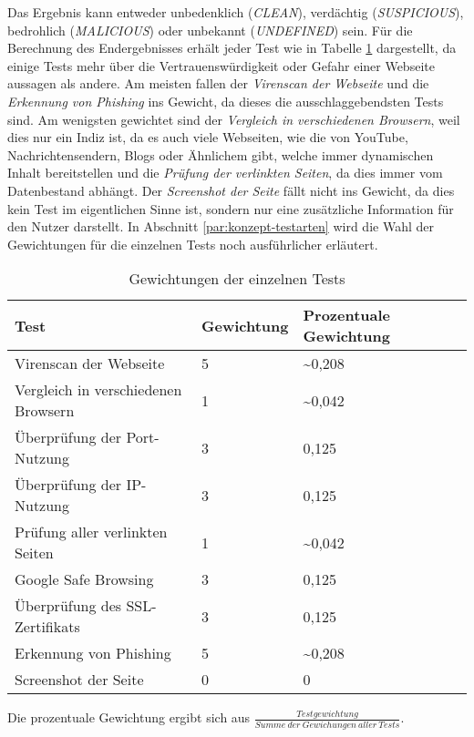 Das Ergebnis kann entweder unbedenklich (\textit{CLEAN}), verdächtig (\textit{SUSPICIOUS}), bedrohlich (\textit{MALICIOUS}) oder unbekannt (\textit{UNDEFINED}) sein. Für die Berechnung des Endergebnisses erhält jeder Test wie in Tabelle \ref{tbl:test-weights} dargestellt, da einige Tests mehr über die Vertrauenswürdigkeit oder Gefahr einer Webseite aussagen als andere. Am meisten fallen der \textit{Virenscan der Webseite} und die \textit{Erkennung von Phishing} ins Gewicht, da dieses die ausschlaggebendsten Tests sind. Am wenigsten gewichtet sind der \textit{Vergleich in verschiedenen Browsern}, weil dies nur ein Indiz ist, da es auch viele Webseiten, wie die von YouTube, Nachrichtensendern, Blogs oder Ähnlichem gibt, welche immer dynamischen Inhalt bereitstellen und die \textit{Prüfung der verlinkten Seiten}, da dies immer vom Datenbestand abhängt. Der \textit{Screenshot der Seite} fällt nicht ins Gewicht, da dies kein Test im eigentlichen Sinne ist, sondern nur eine zusätzliche Information für den Nutzer darstellt. In Abschnitt \ref{par:konzept-testarten} wird die Wahl der Gewichtungen für die einzelnen Tests noch ausführlicher erläutert.

\begin{table}[H]
\centering
\begin{tabular}{|l|l|l|l|}
\hline
\textbf{Test} & \textbf{Gewichtung} & \textbf{Prozentuale Gewichtung} \\\hline
Virenscan der Webseite & 5 & \textasciitilde0,208\\\hline
Vergleich in verschiedenen Browsern & 1 & \textasciitilde0,042\\\hline
Überprüfung der Port-Nutzung & 3 & 0,125\\\hline
Überprüfung der IP-Nutzung & 3 & 0,125\\\hline
Prüfung aller verlinkten Seiten & 1 & \textasciitilde0,042\\\hline
Google Safe Browsing & 3 & 0,125\\\hline
Überprüfung des SSL-Zertifikats & 3 & 0,125\\\hline
Erkennung von Phishing & 5 & \textasciitilde0,208\\\hline
Screenshot der Seite & 0 & 0\\\hline
\end{tabular}
\caption{Gewichtungen der einzelnen Tests}
\label{tbl:test-weights}
\end{table}

Die prozentuale Gewichtung ergibt sich aus $\frac{Testgewichtung}{Summe~der~Gewichungen~aller~Tests}$.

